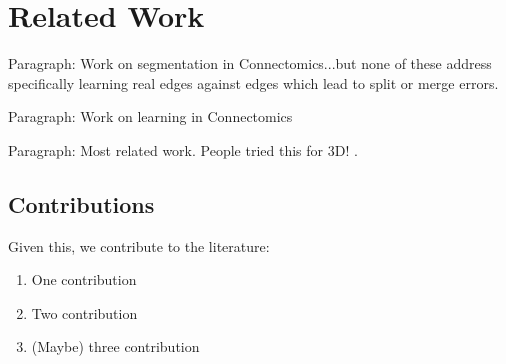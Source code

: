 \section{Related Work}

Paragraph: Work on segmentation in Connectomics...but none of these address specifically learning real edges against edges which lead to split or merge errors.

Paragraph: Work on learning in Connectomics

Paragraph: Most related work. People tried this for 3D! \cite{BogovicHJ13}.

\subsection{Contributions}

Given this, we contribute to the literature:
\begin{enumerate}
\item One contribution
\item Two contribution
\item (Maybe) three contribution
\end{enumerate}